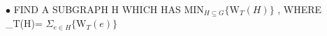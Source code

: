 \documentclass[preview]{standalone}
\begin{document}
\begin{center}
$\bullet$ FIND   A   SUBGRAPH   H  WHICH   HAS $\text{MIN}_{\scriptscriptstyle H \subseteq G} \{ \text{W}_{T}(H) \}$ ,  WHERE   _{T}(H)= $\Sigma_{e \in H} \{ \text{W}_{T}(e) \}$
\end{center}
\end{document}
